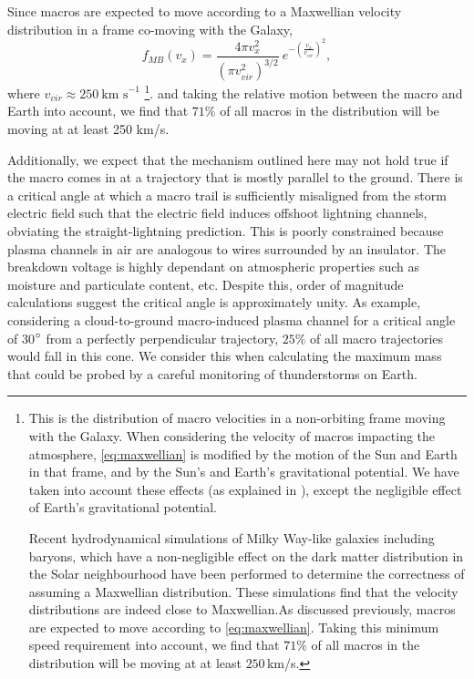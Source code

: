 \documentclass[%
 reprint,
 amsmath,amssymb,
 aps,
]{revtex4-2}
\begin{document}
        Since macros are expected to move according to a Maxwellian velocity distribution in a frame co-moving with the Galaxy,
        \begin{equation}\label{eq:maxwellian}
        	f_{MB}(v_x) = 
        		\frac{4\pi v_x^2}
        		{\left({\pi v_{vir}^2}\right)^{3/2}}~
        		e^{-\left(\frac{v_x}{v_{vir}}\right)^2}, 
        \end{equation}
        where $v_{vir} \approx 250~ \text{km s}^{-1}$ \footnote{
        	This is the distribution of macro velocities in a non-orbiting frame moving with the Galaxy. When considering the velocity of macros impacting the atmosphere, \eqref{eq:maxwellian} is modified by the motion of the Sun and Earth in that frame, and by the Sun's and Earth's gravitational potential. We have taken into account these effects (as explained  in \cite{Freese2013}), except the negligible effect of Earth's gravitational potential.

        	Recent hydrodynamical simulations of Milky Way-like galaxies including baryons, which have a non-negligible effect on the dark matter distribution in the Solar neighbourhood \cite{Tanabashi2018} have been performed to determine the correctness of assuming a Maxwellian distribution. These simulations find that the velocity distributions are indeed close to Maxwellian.As discussed previously, macros are expected to move according to \eqref{eq:maxwellian}. Taking this minimum speed requirement into account, we find that $71\%$ of all macros in the distribution will be moving at at least $250\,$km/s. 
    	}.
        and taking the relative motion between the macro and Earth into account, we find that $71\%$ of all macros in the distribution will be moving at at least 250 km/s.

        Additionally, we expect that the mechanism outlined here may not hold true if the macro comes in at a trajectory that is mostly parallel to the ground. There is a critical angle at which a macro trail is sufficiently misaligned from the storm electric field such that the electric field induces offshoot lightning channels, obviating the straight-lightning prediction. This is poorly constrained because plasma channels in air are analogous to wires surrounded by an insulator. The breakdown voltage is highly dependant on atmospheric properties such as moisture and particulate content, etc. Despite this, order of magnitude calculations suggest the critical angle is approximately unity. As example, considering a cloud-to-ground macro-induced plasma channel for a critical angle of 30$\degree$ from a perfectly perpendicular trajectory, $25\%$ of all macro trajectories would fall in this cone. We consider this when calculating the maximum mass that could be probed by a careful monitoring of thunderstorms on Earth.
\end{document}
